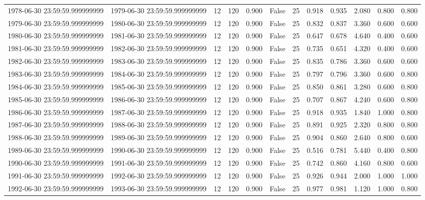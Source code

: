 \begin{table}
\begin{tabular}{lccccccccccc}
1978-06-30 23:59:59.999999999 & 1979-06-30 23:59:59.999999999 & 12 & 120 & 0.900 & False & 25 & 0.918 & 0.935 & 2.080 & 0.800 & 0.800 \\
1979-06-30 23:59:59.999999999 & 1980-06-30 23:59:59.999999999 & 12 & 120 & 0.900 & False & 25 & 0.832 & 0.837 & 3.360 & 0.600 & 0.600 \\
1980-06-30 23:59:59.999999999 & 1981-06-30 23:59:59.999999999 & 12 & 120 & 0.900 & False & 25 & 0.647 & 0.678 & 4.640 & 0.400 & 0.600 \\
1981-06-30 23:59:59.999999999 & 1982-06-30 23:59:59.999999999 & 12 & 120 & 0.900 & False & 25 & 0.735 & 0.651 & 4.320 & 0.400 & 0.600 \\
1982-06-30 23:59:59.999999999 & 1983-06-30 23:59:59.999999999 & 12 & 120 & 0.900 & False & 25 & 0.835 & 0.786 & 3.360 & 0.600 & 0.600 \\
1983-06-30 23:59:59.999999999 & 1984-06-30 23:59:59.999999999 & 12 & 120 & 0.900 & False & 25 & 0.797 & 0.796 & 3.360 & 0.600 & 0.800 \\
1984-06-30 23:59:59.999999999 & 1985-06-30 23:59:59.999999999 & 12 & 120 & 0.900 & False & 25 & 0.850 & 0.861 & 3.280 & 0.600 & 0.800 \\
1985-06-30 23:59:59.999999999 & 1986-06-30 23:59:59.999999999 & 12 & 120 & 0.900 & False & 25 & 0.707 & 0.867 & 4.240 & 0.600 & 0.800 \\
1986-06-30 23:59:59.999999999 & 1987-06-30 23:59:59.999999999 & 12 & 120 & 0.900 & False & 25 & 0.918 & 0.935 & 1.840 & 1.000 & 0.800 \\
1987-06-30 23:59:59.999999999 & 1988-06-30 23:59:59.999999999 & 12 & 120 & 0.900 & False & 25 & 0.891 & 0.925 & 2.320 & 0.800 & 0.800 \\
1988-06-30 23:59:59.999999999 & 1989-06-30 23:59:59.999999999 & 12 & 120 & 0.900 & False & 25 & 0.904 & 0.860 & 2.640 & 0.800 & 0.600 \\
1989-06-30 23:59:59.999999999 & 1990-06-30 23:59:59.999999999 & 12 & 120 & 0.900 & False & 25 & 0.516 & 0.781 & 5.440 & 0.400 & 0.800 \\
1990-06-30 23:59:59.999999999 & 1991-06-30 23:59:59.999999999 & 12 & 120 & 0.900 & False & 25 & 0.742 & 0.860 & 4.160 & 0.800 & 0.600 \\
1991-06-30 23:59:59.999999999 & 1992-06-30 23:59:59.999999999 & 12 & 120 & 0.900 & False & 25 & 0.926 & 0.944 & 2.000 & 1.000 & 1.000 \\
1992-06-30 23:59:59.999999999 & 1993-06-30 23:59:59.999999999 & 12 & 120 & 0.900 & False & 25 & 0.977 & 0.981 & 1.120 & 1.000 & 0.800 \\

\end{tabular}
\end{table}
